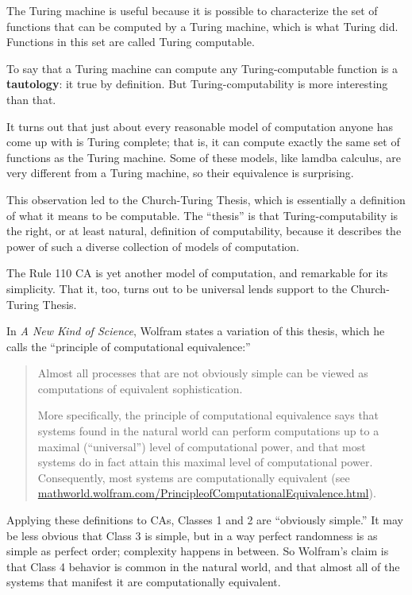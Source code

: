 \documentclass[10pt]{book}
\begin{document}
The Turing machine is useful because it is possible to characterize
the set of functions that can be computed by a Turing machine,
which is what Turing did.  Functions in this set are
called Turing computable.

To say that a Turing machine can compute any Turing-computable
function is a {\bf tautology}: it true by definition.  But
Turing-computability is more interesting than that.

It turns out that just about every reasonable model of computation
anyone has come up with is Turing complete; that is, it can compute
exactly the same set of functions as the Turing machine.
Some of these models, like lamdba calculus, are very different
from a Turing machine, so their equivalence is surprising.

This observation led to the Church-Turing Thesis, which is essentially
a definition of what it means to be computable.  The ``thesis'' is
that Turing-computability is the right, or at least natural,
definition of computability, because it describes the power of such a
diverse collection of models of computation.

The Rule 110 CA is yet another model of computation, and remarkable
for its simplicity.  That it, too, turns out to be universal lends
support to the Church-Turing Thesis.

In {\em A New Kind of Science}, Wolfram states a variation of this
thesis, which he calls the ``principle of computational equivalence:''

\begin{quote}
Almost all processes that are not obviously simple can be viewed as
computations of equivalent sophistication.

More specifically, the principle of computational equivalence says
that systems found in the natural world can perform computations up to
a maximal (``universal'') level of computational power, and that most
systems do in fact attain this maximal level of computational
power. Consequently, most systems are computationally
equivalent (see
  \url{mathworld.wolfram.com/PrincipleofComputationalEquivalence.html}).
\end{quote}

Applying these definitions to CAs, Classes 1 and 2 are ``obviously
simple.''  It may be less obvious that Class 3 is simple, but in a way
perfect randomness is as simple as perfect order; complexity happens
in between.  So Wolfram's claim is that Class 4 behavior is common in
the natural world, and that almost all of the systems that manifest it
are computationally equivalent.
\end{document}

